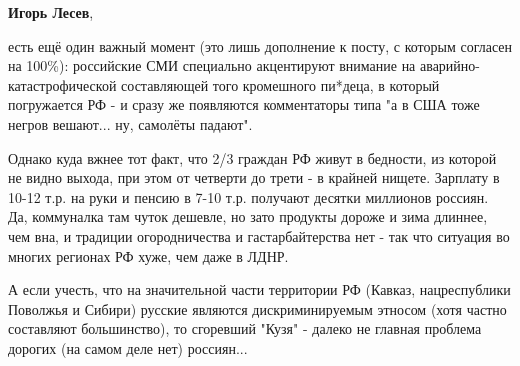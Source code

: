 \begin{itemize}
\textbf{Игорь Лесев}, 

есть ещё один важный момент (это лишь дополнение к посту, с которым согласен на
100\%): российские СМИ специально акцентируют внимание на
аварийно-катастрофической составляющей того кромешного пи*деца, в который
погружается РФ - и сразу же появляются комментаторы типа "а в США тоже негров
вешают... ну, самолёты падают".

Однако куда вжнее тот факт, что 2/3 граждан РФ живут в бедности, из которой не
видно выхода, при этом от четверти до трети - в крайней нищете. Зарплату в
10-12 т.р. на руки и пенсию в 7-10 т.р. получают десятки миллионов россиян. Да,
коммуналка там чуток дешевле, но зато продукты дороже и зима длиннее, чем вна,
и традиции огородничества и гастарбайтерства нет - так что ситуация во многих
регионах РФ хуже, чем даже в ЛДНР.

А если учесть, что на значительной части территории РФ (Кавказ, нацреспублики
Поволжья и Сибири) русские являются дискриминируемым этносом (хотя частно
составляют большинство), то сгоревший "Кузя" - далеко не главная проблема
дорогих (на самом деле нет) россиян...


\end{itemize} %

